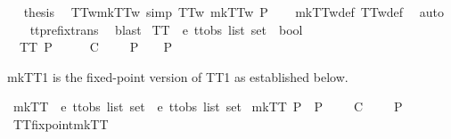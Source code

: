\begin{isabellebody}
\ \isamarkupfalse%
\ {\isacharquery}thesis\ \isacommand{{\isachardot}}\isamarkupfalse%
\isanewline
{}\isamarkupfalse%
%
\endisatagproof
{\isafoldproof}%
%
\isadelimproof
\isanewline
%
\endisadelimproof
\isanewline
{}\isamarkupfalse%
\ TT{}w{\isacharunderscore}mkTT{}w\ {\isacharbrackleft}simp{\isacharbrackright}{\isacharcolon}\ {\isachardoublequoteopen}TT{}w\ {\isacharparenleft}mkTT{}w\ P{\isacharparenright}{\isachardoublequoteclose}\isanewline
%
\isadelimproof
\ \ %
\endisadelimproof
%
\isatagproof
{}\isamarkupfalse%
\ mkTT{}w{\isacharunderscore}def\ TT{}w{\isacharunderscore}def\ \isamarkupfalse%
\ auto\isanewline
\ \ \isamarkupfalse%
\ tt{\isacharunderscore}prefix{\isacharunderscore}trans\ \isamarkupfalse%
\ blast%
\endisatagproof
{\isafoldproof}%
%
\isadelimproof
\isanewline
%
\endisadelimproof
\isanewline
{}\isamarkupfalse%
\ TT{}\ {\isacharcolon}{\isacharcolon}\ {\isachardoublequoteopen}{\isacharprime}e\ ttobs\ list\ set\ {\isasymRightarrow}\ bool{\isachardoublequoteclose}\ \isanewline
\ \ {\isachardoublequoteopen}TT{}\ P\ {\isacharequal}\ {\isacharparenleft}{\isasymforall}\ {\isasymrho}\ {\isasymsigma}{\isachardot}\ {\isacharparenleft}{\isasymrho}\ {\isasymlesssim}\isactrlsub C\ {\isasymsigma}\ {\isasymand}\ {\isasymsigma}\ {\isasymin}\ P{\isacharparenright}\ {\isasymlongrightarrow}\ {\isasymrho}\ {\isasymin}\ P{\isacharparenright}{\isachardoublequoteclose}%
\begin{isamarkuptext}%
mkTT1 is the fixed-point version of TT1 as established below.%
\end{isamarkuptext}\isamarkuptrue%
\isamarkupfalse%
\ mkTT{}\ {\isacharcolon}{\isacharcolon}\ {\isachardoublequoteopen}{\isacharprime}e\ ttobs\ list\ set\ {\isasymRightarrow}\ {\isacharprime}e\ ttobs\ list\ set{\isachardoublequoteclose}\ \isanewline
{\isachardoublequoteopen}mkTT{}\ P\ {\isacharequal}\ P\ {\isasymunion}\ {\isacharbraceleft}{\isasymrho}{\isacharbar}{\isasymrho}\ {\isasymsigma}{\isachardot}\ {\isasymrho}\ {\isasymlesssim}\isactrlsub C\ {\isasymsigma}\ {\isasymand}\ {\isasymsigma}\ {\isasymin}\ P{\isacharbraceright}{\isachardoublequoteclose}\isanewline
\isanewline
{}\isamarkupfalse%
\ TT{}{\isacharunderscore}fixpoint{\isacharunderscore}mkTT{}{\isacharcolon}\isanewline

\end{isabellebody}
